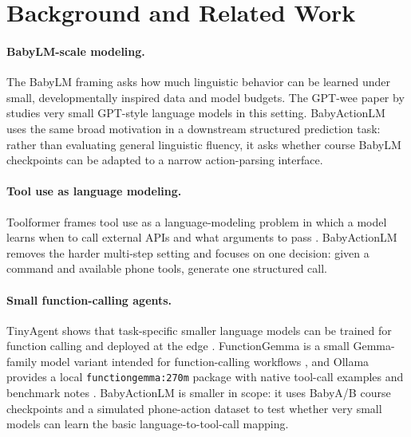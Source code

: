 \section{Background and Related Work}

\paragraph{BabyLM-scale modeling.}
The BabyLM framing asks how much linguistic behavior can be learned under small, developmentally inspired data and model budgets. The GPT-wee paper by \citet{bunzeck-zarriess-2023-gpt} studies very small GPT-style language models in this setting. BabyActionLM uses the same broad motivation in a downstream structured prediction task: rather than evaluating general linguistic fluency, it asks whether course BabyLM checkpoints can be adapted to a narrow action-parsing interface.

\paragraph{Tool use as language modeling.}
Toolformer frames tool use as a language-modeling problem in which a model learns when to call external APIs and what arguments to pass \citep{schick-etal-2023-toolformer}. BabyActionLM removes the harder multi-step setting and focuses on one decision: given a command and available phone tools, generate one structured call.

\paragraph{Small function-calling agents.}
TinyAgent shows that task-specific smaller language models can be trained for function calling and deployed at the edge \citep{erdogan-etal-2024-tinyagent}. FunctionGemma is a small Gemma-family model variant intended for function-calling workflows \citep{google-functiongemma}, and Ollama provides a local \texttt{functiongemma:270m} package with native tool-call examples and benchmark notes \citep{ollama-functiongemma}. BabyActionLM is smaller in scope: it uses BabyA/B course checkpoints and a simulated phone-action dataset to test whether very small models can learn the basic language-to-tool-call mapping.
